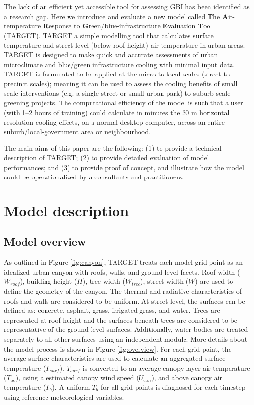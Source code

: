 \documentclass[journal abbreviation, manuscript]{copernicus}
\begin{document}
The lack of an efficient yet accessible tool for assessing GBI has been identified as a research gap. Here we introduce and evaluate a new model called \textbf{T}he \textbf{A}ir-temperature \textbf{R}esponse to \textbf{G}reen/blue-infrastructure \textbf{E}valuation \textbf{T}ool (TARGET). TARGET a simple modelling tool that calculates surface temperature and street level (below roof height) air temperature in urban areas. TARGET is designed to make quick and accurate assessments of urban microclimate and blue/green infrastructure cooling with minimal input data. TARGET is formulated to be applied at the micro-to-local-scales (street-to-precinct scales); meaning it can be used to assess the cooling benefits of small scale interventions (e.g. a single street or small urban park) to suburb scale greening projects. The computational efficiency of the model is such that a user (with 1--2 hours of training) could calculate in minutes the 30 m horizontal resolution  cooling effects, on a normal desktop computer, across an entire suburb/local-government area or neighbourhood. 

The main aims of this paper are the following: (1) to provide a technical description of TARGET; (2) to provide detailed evaluation of model performances; and (3) to provide proof of concept, and illustrate how the model could be operationalized  by a consultants and practitioners.



\section{Model description}\label{sec:ModelOverview}
\subsection{Model overview}

As outlined in Figure \ref{fig:canyon}, TARGET treats each model grid point as an idealized urban canyon with roofs, walls, and  ground-level facets.   Roof width ($W_{roof}$), building  height ($H$), tree width ($W_{tree}$),  street width ($W$)  are used to define the geometry of the canyon. The thermal and radiative characteristics of roofs and walls are considered to be uniform. At street level, the surfaces  can be defined as: concrete, asphalt, grass, irrigated grass, and water. Trees are represented at roof height and the surfaces beneath trees are considered to be representative of the ground level surfaces. Additionally, water bodies are treated separately to all other surfaces using an independent  module. More details about the model process is shown in Figure \ref{fig:overview}. For each grid point, the average surface characteristics are used to calculate an aggregated surface temperature ($T_{surf}$). $T_{surf}$ is converted to an average canopy layer air temperature ($T_{ac}$), using a estimated canopy wind speed ($U_{can}$), and above canopy air temperature (\ensuremath{T_{b}}).  A uniform \ensuremath{T_{b}} for all grid points is diagnosed for each timestep using reference meteorological variables. 
\end{document}
